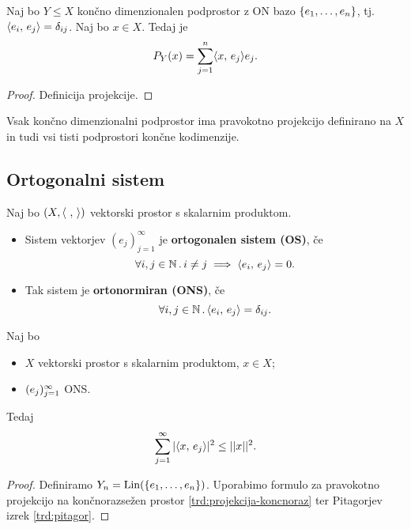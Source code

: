 \begin{trditev}
    \label{trd:projekcija-koncnoraz}
    Naj bo \(Y \leq X\) končno dimenzionalen podprostor z ON bazo \(\{e_1, \ldots, e_n\}\), tj.\ \(\langle e_i, \, e_j \rangle = \delta_{ij}\). Naj bo \(x \in X\). Tedaj je \[P_Y(x) = \sum_{j=1}^{n} \langle x, \, e_j \rangle e_j.\]
\end{trditev}

\begin{proof}
    Definicija projekcije.
\end{proof}

\begin{opomba}
    Vsak končno dimenzionalni podprostor ima pravokotno projekcijo definirano na \(X\) in tudi vsi tisti podprostori končne kodimenzije.
\end{opomba}

\subsection{Ortogonalni sistem}
\begin{definicija}
    Naj bo \((X, \langle \ , \,  \rangle)\) vektorski prostor s skalarnim produktom. 
    \begin{itemize}
        \item Sistem vektorjev \((e_j)_{j=1}^\infty\) je \textbf{ortogonalen sistem (OS)}, če \[\forall i,j \in \mathbb{N} \,.\, i \neq j \implies \langle e_i, \, e_j \rangle = 0.\]
        \item Tak sistem je \textbf{ortonormiran (ONS)}, če \[\forall i,j \in \mathbb{N} \,.\, \langle e_i, \, e_j \rangle = \delta_{ij}.\]
    \end{itemize}   
\end{definicija}

\begin{trditev}
    \label{trd:besselova-neenakost}
    Naj bo 
    \begin{itemize}
        \item \(X\) vektorski prostor s skalarnim produktom, \(x \in X\);
        \item \((e_j)_{j=1}^\infty\) ONS.
    \end{itemize}
    Tedaj 
    \[\sum_{j=1}^{\infty}|\langle x, \, e_j \rangle|^2 \leq ||x||^2.\]  
\end{trditev}

\begin{proof}
    Definiramo \(Y_n = \operatorname{Lin}(\{e_1, \ldots, e_n\})\). Uporabimo formulo za pravokotno projekcijo na končnorazsežen prostor \ref{trd:projekcija-koncnoraz} ter Pitagorjev izrek \ref{trd:pitagor}.
\end{proof}

